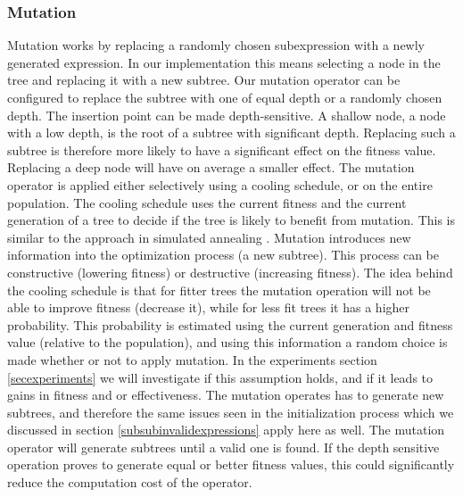 \subsubsection{Mutation}
Mutation works by replacing a randomly chosen subexpression with a newly generated expression. In our implementation this means selecting a node in the tree and replacing it with a new subtree. Our mutation operator can be configured to replace the subtree with one of equal depth or a randomly chosen depth. The insertion point can be made depth-sensitive. A shallow node, a node with a low depth, is the root of a subtree with significant depth. Replacing such a subtree is therefore more likely to have a significant effect on the fitness value. Replacing a deep node will have on average a smaller effect.
The mutation operator is applied either selectively using a cooling schedule, or on the entire population. 
The cooling schedule uses the current fitness and the current generation of a tree to decide if the tree is likely to benefit from mutation. This is similar to the approach in simulated annealing \citep{SA}.
Mutation introduces new information into the optimization process (a new subtree). This process can be constructive (lowering fitness) or destructive (increasing fitness). The idea behind the cooling schedule is that for fitter trees the mutation operation will not be able to improve fitness (decrease it), while for less fit trees it has a higher probability. 
This probability is estimated using the current generation and fitness value (relative to the population), and using this information a random choice is made whether or not to apply mutation. In the experiments section \ref{secexperiments} we will investigate if this assumption holds, and if it leads to gains in fitness and or effectiveness.
The mutation operates has to generate new subtrees, and therefore the same issues seen in the initialization process which we discussed in section \ref{subsubinvalidexpressions} apply here as well. The mutation operator will generate subtrees until a valid one is found. If the depth sensitive operation proves to generate equal or better fitness values, this could significantly reduce the computation cost of the operator.

